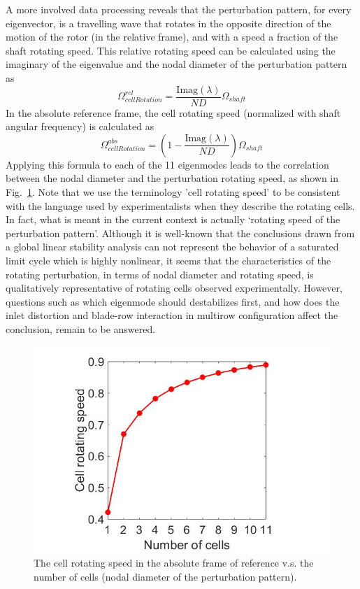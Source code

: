 \documentclass[journal,final]{new-aiaa}
\begin{document}
A more involved data processing reveals that the perturbation pattern,
for every eigenvector, is a travelling wave that rotates in the opposite
direction of the motion of the rotor (in the relative frame), and with a speed a fraction of the
shaft rotating speed. This relative rotating speed can be
calculated using the imaginary of the eigenvalue and the nodal diameter
of the perturbation pattern as 
\begin{equation}\label{cellrotspd}
\Omega_{cellRotation}^{rel}= \dfrac{\text{Imag}(\lambda)}{ND} \Omega_{shaft}
\end{equation}
In the absolute reference frame, the cell rotating speed (normalized
with shaft angular frequency) is calculated as
\begin{equation}\label{cellrotspd}
\Omega_{cellRotation}^{abs}= \left (1-\dfrac{\text{Imag}(\lambda)}{ND}\right ) \Omega_{shaft}
\end{equation}
Applying this formula to each of the 11 eigenmodes leads to the
correlation between the nodal diameter and the perturbation rotating speed, as shown in Fig.~\ref{fig:r67-eigenvector-18kpa}. Note that we use the terminology 'cell rotating speed'
to be consistent with the language used by experimentalists when they describe
the rotating cells. In fact, what is meant in the current context is actually
`rotating speed of the perturbation pattern'.
Although it is well-known that the conclusions drawn from a global linear
stability analysis can not represent the behavior of a saturated limit cycle
which is highly nonlinear, it seems that the characteristics of the
rotating perturbation,
in terms of nodal diameter and rotating speed, is qualitatively representative
of rotating cells observed experimentally. However, questions such as which eigenmode
should destabilizes first, and how does the inlet distortion and blade-row interaction in
multirow configuration affect the conclusion, remain to be answered.

\begin{figure}[htb]
	\centering   
{\tiny }	\includegraphics[width=.4\textwidth]{pic/speed-vs-nd.jpg}
	\caption{The cell rotating speed in the absolute frame of reference v.s. the number of cells (nodal diameter of the perturbation pattern).}
	\label{fig:r67-eigenvector-18kpa}
\end{figure}
\end{document}
